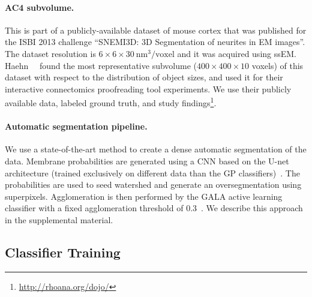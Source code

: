 \paragraph{AC4 subvolume.} This is part of a publicly-available dataset of mouse cortex that was published for the ISBI 2013 challenge ``SNEMI3D: 3D Segmentation of neurites in EM images''. The dataset resolution is $6\times6\times30~\text{nm}^3\text{/voxel}$ and it was acquired using ssEM. Haehn~\etal~\cite{haehn_dojo_2014} found the most representative subvolume ($400\times400\times10$ voxels) of this dataset with respect to the distribution of object sizes, and used it for their interactive connectomics proofreading tool experiments. We use their publicly available data, labeled ground truth, and study findings\footnote{\scriptsize{\url{http://rhoana.org/dojo/}}}.


\paragraph{Automatic segmentation pipeline.}
We use a state-of-the-art method to create a dense automatic segmentation of the data. Membrane probabilities are generated using a CNN based on the U-net architecture (trained exclusively on different data than the GP classifiers)~\cite{RonnebergerFB15}. The probabilities are used to seed watershed and generate an oversegmentation using superpixels. Agglomeration is then performed by the GALA active learning classifier with a fixed agglomeration threshold of 0.3~\cite{nunez2014graph}. We describe this approach in the supplemental material.

\subsection{Classifier Training}

